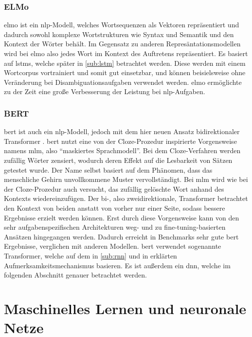 \subsubsection{ELMo}\label{subsub:elmo}
\ac{elmo}
\citep{elmo} ist ein \ac{nlp}-Modell, welches Wortsequenzen als Vektoren repräsentiert und dadurch sowohl komplexe Wortstrukturen wie Syntax und Semantik und den Kontext der Wörter behält.
Im Gegensatz zu anderen Represäntationsmodellen wird bei \ac{elmo} also jedes Wort im Kontext des Auftretens repräsentiert.
Es basiert auf \acsp{lstm}, welche später in \cref{sub:lstm} betrachtet werden.
Diese werden mit einem Wortcorpus vortrainiert und somit gut einsetzbar, und können beisielsweise ohne Veränderung bei Disambiguationsaufgaben verwendet werden.
\ac{elmo} ermöglichte zu der Zeit eine große Verbesserung der Leistung bei \ac{nlp}-Aufgaben.

\subsubsection{BERT}\label{subsub:bert}
\ac{bert}
\citep{bert} ist auch ein \ac{nlp}-Modell, jedoch mit dem hier neuen Ansatz bidirektionaler Transformer \citep{attention}.
\ac{bert} nutzt eine von der Cloze-Prozedur inspirierte Vorgensweise namens \ac{mlm}, also \enquote{maskiertes Sprachmodell}.
Bei dem Cloze-Verfahren werden zufällig Wörter zensiert, wodurch deren Effekt auf die Lesbarkeit von Sätzen getestet wurde.
Der Name selbst basiert auf dem Phänomen, dass das menschliche Gehirn unvollkommene Muster vervollständigt.
Bei \ac{mlm} wird wie bei der Cloze-Prozedur auch versucht, das zufällig gelöschte Wort anhand des Kontexts wiedereinzufügen.
Der bi-, also zweidirektionale, Transformer betrachtet den Kontext von beiden anstatt von vorher nur einer Seite, sodass bessere Ergebnisse erzielt werden können.
Erst durch diese Vorgensweise kann von den sehr aufgabenspezifischen Architekturen weg- und zu fine-tuning-basierten Ansätzen hingegangen werden.
Dadurch erreicht in Benchmarks sehr gute \ac{bert} Ergebnisse, verglichen mit anderen Modellen.
\ac{bert} verwendet sogenannte Transformer, welche auf dem in \cref{sub:rnn} und in \citet{annotatedtransformer} erklärten Aufmerksamkeitsmechanismus basieren.
Es ist außerdem ein \acs{dnn}, welche im folgenden Abschnitt genauer betrachtet werden.

\section{Maschinelles Lernen und neuronale Netze}

